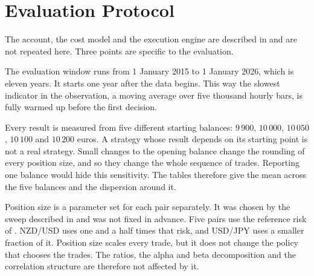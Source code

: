 \section{Evaluation Protocol}
\label{Section:EvaluationProtocol}

The account, the cost model and the execution engine are described in  and are not repeated here. Three points are specific to the evaluation.

The evaluation window runs from 1 January 2015 to 1 January 2026, which is eleven years. It starts one year after the data begins. This way the slowest indicator in the observation, a moving average over five thousand hourly bars, is fully warmed up before the first decision.

Every result is measured from five different starting balances: $9\,900$, $10\,000$, $10\,050$, $10\,100$ and $10\,200$ euros. A strategy whose result depends on its starting point is not a real strategy. Small changes to the opening balance change the rounding of every position size, and so they change the whole sequence of trades. Reporting one balance would hide this sensitivity. The tables therefore give the mean across the five balances and the dispersion around it.

Position size is a parameter set for each pair separately. It was chosen by the sweep described in  and was not fixed in advance. Five pairs use the reference risk of . NZD/USD uses one and a half times that risk, and USD/JPY uses a smaller fraction of it. Position size scales every trade, but it does not change the policy that chooses the trades. The ratios, the alpha and beta decomposition and the correlation structure are therefore not affected by it.
